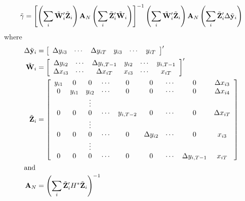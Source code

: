 \begin{equation}
\label{eq:sys-gmm}
  \tilde{\gamma} = \left[ 
    \left( \sum_i \tilde{\mathbf{W}}_i'\tilde{\mathbf{Z}}_i \right) \mathbf{A}_N
    \left( \sum_i \tilde{\mathbf{Z}}_i'\tilde{\mathbf{W}}_i \right) \right]^{-1} 
    \left( \sum_i \tilde{\mathbf{W}}_i'\tilde{\mathbf{Z}}_i \right) \mathbf{A}_N
    \left( \sum_i \tilde{\mathbf{Z}}_i'\Delta \tilde{\mathbf{y}}_i \right)
\end{equation}
where
\begin{align*}
  \Delta \tilde{\mathbf{y}}_i  & =
     \left[ \begin{array}{ccccccc}
         \Delta y_{i3} & \cdots & \Delta y_{iT} & y_{i3} & \cdots & y_{iT}
       \end{array} \right]' \\
  \tilde{\mathbf{W}}_i  & =
     \left[ \begin{array}{cccccc}
         \Delta y_{i2} & \cdots & \Delta y_{i,T-1} & y_{i2} & \cdots & y_{i,T-1} \\
         \Delta x_{i3} & \cdots & \Delta x_{iT}  & x_{i3} & \cdots & x_{iT} \\
       \end{array} \right]' \\
  \tilde{\mathbf{Z}}_i  & =
     \left[ \begin{array}{ccccccccc}
         y_{i1} & 0 & 0       & \cdots & 0  & 0  & \cdots & 0 & \Delta x_{i3}\\
         0 & y_{i1} & y_{i2} & \cdots & 0  & 0  & \cdots & 0 & \Delta x_{i4}\\
         & & \vdots \\
         0 & 0 & 0 & \cdots & y_{i,T-2} & 0  & \cdots & 0  & \Delta x_{iT}\\
         & & \vdots \\
         0 & 0 & 0 & \cdots & 0 & \Delta y_{i2} & \cdots & 0  & x_{i3}\\
         & & \vdots \\
         0 & 0 & 0 & \cdots & 0 & 0 & \cdots & \Delta y_{i,T-1}  & x_{iT}\\
       \end{array} \right] \\
  \intertext{and}
  \mathbf{A}_N & = \left( \sum_i \tilde{\mathbf{Z}}_i' H^* \tilde{\mathbf{Z}}_i \right)^{-1}
\end{align*}

